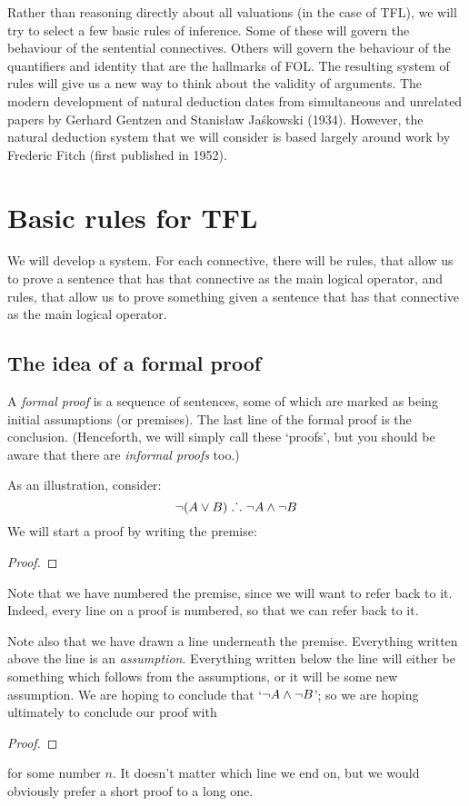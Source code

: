 Rather than reasoning directly about all valuations (in the case of TFL), we will try to select a few basic rules of inference. Some of these will govern the behaviour of the sentential connectives. Others will govern the behaviour of the quantifiers and identity that are the hallmarks of FOL. The resulting system of rules will give us a new way to think about the validity of arguments. 
The modern development of natural deduction dates from simultaneous and unrelated papers by Gerhard Gentzen and Stanis\l{}aw Ja\'{s}kowski (1934). However, the natural deduction system that we will consider is based largely around work by Frederic Fitch (first published in 1952). 



\chapter{Basic rules for TFL}\label{s:BasicTFL}
We will develop a  system. For each connective, there will be  rules, that allow us to prove a sentence that has that connective as the main logical operator, and  rules, that allow us to prove something given a sentence that has that connective as the main logical operator.

\section{The idea of a formal proof}
A \emph{formal proof} is a sequence of sentences, some of which are marked as being initial assumptions (or premises). The last line of the formal proof is the conclusion. (Henceforth, we will simply call these `proofs', but you should be aware that there are \emph{informal proofs} too.)

As an illustration, consider:
	$$\neg (A \vee B) \mathrel{\ldotp\dot{}\,\ldotp} \neg A \wedge \neg B$$
We will start a proof by writing the premise:
\begin{proof}
\end{proof}
Note that we have numbered the premise, since we will want to refer back to it. Indeed, every line on a proof is numbered, so that we can refer back to it. 

Note also that we have drawn a line underneath the premise. Everything written above the line is an \emph{assumption}. Everything written below the line will either be something which follows from the assumptions, or it will be some new assumption. We are hoping to conclude that `$\neg A \wedge \neg B$'; so we are hoping ultimately to conclude our proof with
\begin{proof}
\end{proof}
for some number $n$. It doesn't matter which line we end on, but we would obviously prefer a short proof to a long one.

